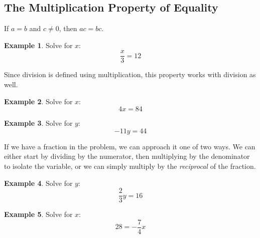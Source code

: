 \documentclass[addpoints,12pt]{exam}
\theoremstyle{definition}
\theoremstyle{break}
\theoremstyle{break}
\newtheorem{example}{Example}[subsection]
\begin{document}
\setcounter{section}{2}
\setcounter{subsection}{1}

\subsection{The Multiplication Property of Equality}

\vspace{.25in}

\begin{definition}
If $a=b$ and $c\neq 0$, then $ac=bc$.
\end{definition}

\vspace{.15in}

\begin{example}
Solve for $x$: \[\dfrac{x}{3} = 12\]
\vspace{1in}
\end{example}

\noindent Since division is defined using multiplication, this property works with division as well.

\vspace{.15in}

\begin{example}
Solve for $x$: \[4x = 84\]
\vspace{1in}
\end{example}

\begin{example}
Solve for $y$: \[ -11y = 44\]
\end{example}

\newpage

\noindent If we have a fraction in the problem, we can approach it one of two ways. We can either start by dividing by the numerator, then multiplying by the denominator to isolate the variable, or we can simply multiply by the \emph{reciprocal} of the fraction.

\vspace{.15in}

\begin{example}
Solve for $y$: \[\dfrac{2}{3}y = 16\]
\vspace{1.25in}
\end{example}

\begin{example}
Solve for $x$: \[28 = -\dfrac{7}{4}x\]
\vspace{1.25in}
\end{example}
\end{document}

